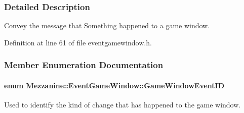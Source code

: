 \subsubsection{Detailed Description}
Convey the message that Something happened to a game window. 

Definition at line 61 of file eventgamewindow.h.



\subsubsection{Member Enumeration Documentation}
\hypertarget{classMezzanine_1_1EventGameWindow_a0f0ff29853317334f018bcf48d502af2}{
\paragraph[{GameWindowEventID}]{\setlength{\rightskip}{0pt plus 5cm}enum {\bf Mezzanine::EventGameWindow::GameWindowEventID}}\hfill}
\label{classMezzanine_1_1EventGameWindow_a0f0ff29853317334f018bcf48d502af2}


Used to identify the kind of change that has happened to the game window. 

